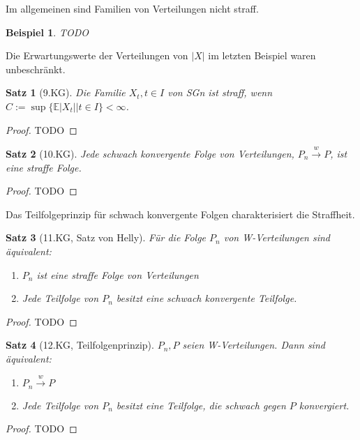 \documentclass[]{article}
\newtheorem{theorem}{Satz}
\newtheorem*{example}{Beispiel}
\begin{document}
Im allgemeinen sind Familien von Verteilungen nicht straff.

\begin{example}
	TODO
\end{example}

Die Erwartungswerte der Verteilungen von $|X|$ im letzten Beispiel waren unbeschränkt.

\begin{theorem}[9.KG]
	Die Familie $X_t, t\in I$ von SGn ist straff, wenn $C:=\sup\{\mathbb{E}|X_t| | t\in I\} < \infty$.
\end{theorem}

\begin{proof}
	TODO
\end{proof}

\begin{theorem}[10.KG]
	Jede schwach konvergente Folge von Verteilungen, $P_n\xrightarrow{w}P$, ist eine straffe Folge.
\end{theorem}

\begin{proof}
	TODO
\end{proof}

Das Teilfolgeprinzip für schwach konvergente Folgen charakterisiert die Straffheit.

\begin{theorem}[11.KG, Satz von Helly]
	Für die Folge $P_n$ von W-Verteilungen sind äquivalent:
	\begin{enumerate}
		\item $P_n$ ist eine straffe Folge von Verteilungen
		\item Jede Teilfolge von $P_n$ besitzt eine schwach konvergente Teilfolge.
	\end{enumerate}
\end{theorem}

\begin{proof}
	TODO
\end{proof}

\begin{theorem}[12.KG, Teilfolgenprinzip]
	$P_n, P$ seien W-Verteilungen. Dann sind äquivalent:
	\begin{enumerate}
		\item $P_n\xrightarrow{w}P$
		\item Jede Teilfolge von $P_n$ besitzt eine Teilfolge, die schwach gegen $P$ konvergiert.
	\end{enumerate}
\end{theorem}

\begin{proof}
	TODO
\end{proof}
\end{document}
